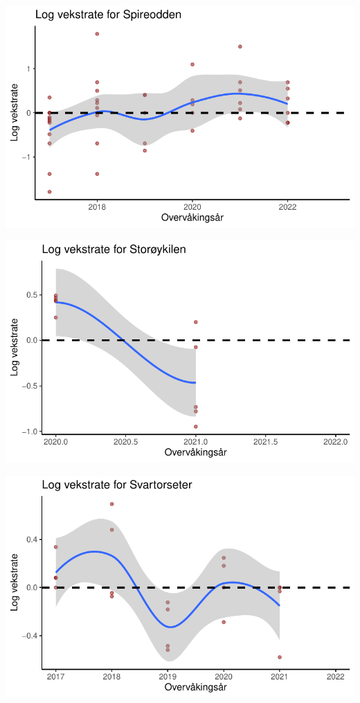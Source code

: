 \documentclass[
  letterpaper,
  DIV=11,
  numbers=noendperiod]{scrreport}
\begin{document}
\includegraphics{growthRate_files/figure-pdf/unnamed-chunk-4-8.pdf}

\includegraphics{growthRate_files/figure-pdf/unnamed-chunk-4-9.pdf}

\includegraphics{growthRate_files/figure-pdf/unnamed-chunk-4-10.pdf}
\end{document}
